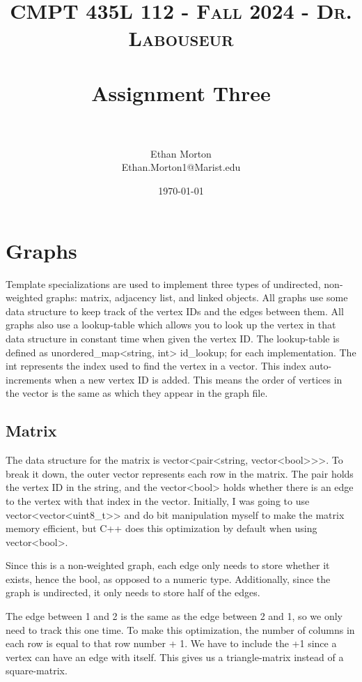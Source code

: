 \documentclass[letterpaper, 10pt,DIV=13]{scrartcl}
\title{	
   \normalfont \normalsize 
   \textsc{CMPT 435L 112 - Fall 2024 - Dr. Labouseur} \\[10pt] %
   \horrule{0.5pt} \\[0.25cm] 	%
   \huge Assignment Three  \\     	    %
   \horrule{0.5pt} \\[0.25cm] 	%
}
\author{Ethan Morton \\ \normalsize Ethan.Morton1@Marist.edu}
\date{\normalsize\today} 	%
\numberwithin{equation}{section} %
\numberwithin{figure}{section} %
\numberwithin{table}{section} %
\begin{document}
\maketitle %

\section{Graphs}
Template specializations are used to implement three types of undirected, non-weighted graphs:
matrix, adjacency list, and linked objects. All graphs use some data structure to keep track of
the vertex IDs and the edges between them. All graphs also use a lookup-table which allows
you to look up the vertex in that data structure in constant time when given the vertex ID.
The lookup-table is defined as unordered\_map<string, int> id\_lookup; for each implementation.
The int represents the index used to find the vertex in a vector. This index auto-increments when
a new vertex ID is added. This means the order of vertices in the vector is the same as which they
appear in the graph file.

\subsection{Matrix}
The data structure for the matrix is vector<pair<string, vector<bool>>>. To break it down, the outer vector
represents each row in the matrix. The pair holds the vertex ID in the string, and the vector<bool> holds
whether there is an edge to the vertex with that index in the vector. Initially, I was going to use
vector<vector<uint8\_t>> and do bit manipulation myself to make the matrix memory efficient, but
C++ does this optimization by default when using vector<bool>.

Since this is a non-weighted graph, each edge only needs to store whether it exists, hence the
bool, as opposed to a numeric type. Additionally, since the graph is undirected, it only needs to
store half of the edges.

The edge between 1 and 2 is the same as the edge between 2 and 1, so we only need to track this
one time. To make this optimization, the number of columns in each row is equal to that row
number + 1. We have to include the +1 since a vertex can have an edge with itself. This gives us a
triangle-matrix instead of a square-matrix.
\end{document}
